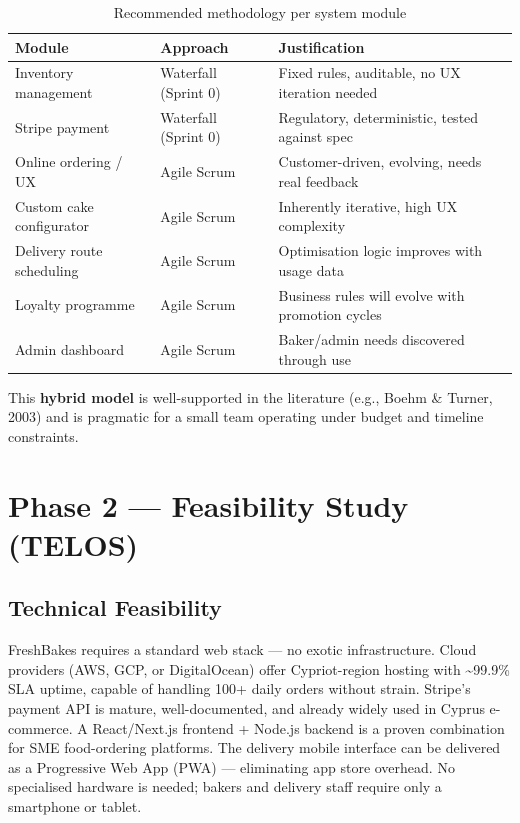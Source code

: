 \documentclass[12pt, a4paper]{report}
\begin{document}
\begin{table}[H]
  \centering
  \begin{tabularx}{\textwidth}{L{4cm} L{3.5cm} X}
    \toprule
    \textbf{Module} & \textbf{Approach} & \textbf{Justification} \\
    \midrule
    Inventory management    & Waterfall (Sprint 0) & Fixed rules, auditable, no UX iteration needed \\
    Stripe payment          & Waterfall (Sprint 0) & Regulatory, deterministic, tested against spec \\
    Online ordering / UX    & Agile Scrum          & Customer-driven, evolving, needs real feedback \\
    Custom cake configurator& Agile Scrum          & Inherently iterative, high UX complexity \\
    Delivery route scheduling& Agile Scrum         & Optimisation logic improves with usage data \\
    Loyalty programme       & Agile Scrum          & Business rules will evolve with promotion cycles \\
    Admin dashboard         & Agile Scrum          & Baker/admin needs discovered through use \\
    \bottomrule
  \end{tabularx}
  \caption{Recommended methodology per system module}
\end{table}

This \textbf{hybrid model} is well-supported in the literature
(e.g., Boehm \& Turner, 2003) and is pragmatic for a small team operating
under budget and timeline constraints.

\chapter{Phase 2 --- Feasibility Study (TELOS)}

\section{Technical Feasibility}

FreshBakes requires a standard web stack --- no exotic infrastructure. Cloud
providers (AWS, GCP, or DigitalOcean) offer Cypriot-region hosting with
\textasciitilde99.9\% SLA uptime, capable of handling 100+ daily orders
without strain. Stripe's payment API is mature, well-documented, and already
widely used in Cyprus e-commerce. A React/Next.js frontend + Node.js backend
is a proven combination for SME food-ordering platforms. The delivery mobile
interface can be delivered as a Progressive Web App (PWA) --- eliminating
app store overhead. No specialised hardware is needed; bakers and delivery
staff require only a smartphone or tablet.
\end{document}
